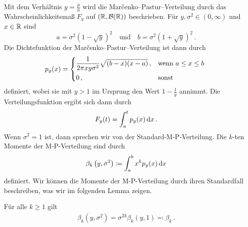\documentclass[../Bachelor_LennartKoliwer.tex]{subfiles}
\begin{document}
Mit dem Verhältnis $y=\frac{p}{n}$ wird die Mar\v{c}enko--Pastur--Verteilung durch das Wahrscheinlichkeitsmaß $F_y$ auf $(\mathbb{R},\mathcal{B}(\mathbb{R}))$ beschrieben.
Für $y,\sigma^2\in(0,\infty)$ und $x\in\mathbb{R}$ sind 
\[
    a=\sigma^2\left(1-\sqrt{y}\right)^2\quad\text{und}\quad b=\sigma^2\left(1+\sqrt{y}\right)^2\,.
\]
Die Dichtefunktion der Mar\v{c}enko--Pastur--Verteilung ist dann durch
\begin{align}
    p_y(x)=\begin{cases*}
        \dfrac{1}{2\pi x y \sigma^2}\sqrt{(b-x)(x-a)}\,, & wenn $a\leq x\leq b$ \\
        0\,, & \text{sonst}
    \end{cases*}\label{eq:MarchenkoPasturDichte}
\end{align}
definiert, wobei sie mit $y>1$ im Ursprung den Wert $1-\frac{1}{y}$ annimmt. 
Die Verteilungsfunktion ergibt sich dann durch
\begin{align*}
    F_y(t)=\int_{a}^{t}p_y(x)\,\text{d} x\,.
\end{align*}
Wenn $\sigma^2=1$ ist, dann sprechen wir von der Standard-M-P-Verteilung.
Die $k$-ten Momente der M-P-Verteilung sind durch
\begin{align}
    \beta_k\left(y,\sigma^2\right)\coloneqq\int_{a}^{b}x^kp_y(x)\,\text{d} x \label{eq:momente}
\end{align} 
definiert. 
Wir können die Momente der M-P-Verteilung durch ihren Standardfall beschreiben, was wir im folgenden Lemma zeigen.
\begin{lemma}\label{lem:betaUmformung}
    Für alle $k\geq1$ gilt
    \begin{align*}
        \beta_k\left(y,\sigma^2\right)=\sigma^{2k}\beta_k\left(y,1\right)\eqqcolon\beta_k\,.
    \end{align*}
\end{lemma}
\end{document}
